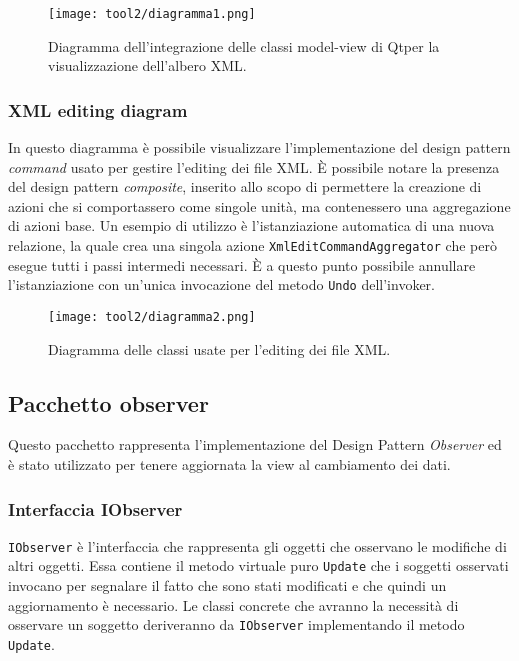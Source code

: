 		\begin{figure}[!h] 
			\centering 
			\texttt{[image: tool2/diagramma1.png]} 
			\caption{Diagramma dell'integrazione delle classi model-view di Qt\textregistered per la visualizzazione dell'albero XML.}
		\end{figure}
		
		\subsubsection{XML editing diagram}
		In questo diagramma è possibile visualizzare l'implementazione del design pattern \textit{command} usato per gestire l'editing dei file XML. È possibile notare la presenza del design pattern \textit{composite}, inserito allo scopo di permettere la creazione di azioni che si comportassero come singole unità, ma contenessero una aggregazione di azioni base. Un esempio di utilizzo è l'istanziazione automatica di una nuova relazione, la quale crea una singola azione \texttt{XmlEditCommandAggregator} che però esegue tutti i passi intermedi necessari. È a questo punto possibile annullare l'istanziazione con un'unica invocazione del metodo \texttt{Undo} dell'invoker.
		
		\begin{figure}[!h] 
			\centering 
			\texttt{[image: tool2/diagramma2.png]} 
			\caption{Diagramma delle classi usate per l'editing dei file XML.}
		\end{figure}

\newpage

\subsection{Pacchetto observer}
Questo pacchetto rappresenta l'implementazione del Design Pattern \textit{Observer} ed è stato utilizzato per tenere aggiornata la view al cambiamento dei dati.

	\subsubsection{Interfaccia IObserver}
		\texttt{IObserver} è l'interfaccia che rappresenta gli oggetti che osservano le modifiche di altri oggetti. Essa contiene il metodo virtuale puro \texttt{Update} che i soggetti osservati invocano per segnalare il fatto che sono stati modificati e che quindi un aggiornamento è necessario. Le classi concrete che avranno la necessità di osservare un soggetto deriveranno da \texttt{IObserver} implementando il metodo \texttt{Update}.

